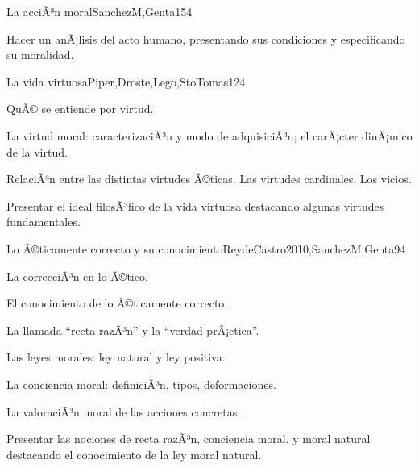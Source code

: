 \begin{syllabus}
\begin{unit}{La acciÃ³n moral}{SanchezM,Genta}{15}{4}
\begin{topics}
\end{topics}
\begin{unitgoals}
	\item Hacer un anÃ¡lisis del acto humano, presentando sus condiciones y especificando su moralidad.
\end{unitgoals}
\end{unit}

\begin{unit}{La vida virtuosa}{Piper,Droste,Lego,StoTomas}{12}{4}
\begin{topics}
	\item	QuÃ© se entiende por virtud.
	\item	La virtud moral: caracterizaciÃ³n y modo de adquisiciÃ³n; el carÃ¡cter dinÃ¡mico de la virtud.
	\item	RelaciÃ³n entre las distintas virtudes Ã©ticas. Las virtudes cardinales. Los vicios.

\end{topics}
\begin{unitgoals}
	\item Presentar el ideal filosÃ³fico de la vida virtuosa destacando algunas virtudes fundamentales.
\end{unitgoals}
\end{unit}

\begin{unit}{Lo Ã©ticamente correcto y su conocimiento}{ReydeCastro2010,SanchezM,Genta}{9}{4}
\begin{topics}
	\item 	La correcciÃ³n en lo Ã©tico.
	\item 	El conocimiento de lo Ã©ticamente correcto.
	\item 	La llamada ``recta razÃ³n'' y la ``verdad prÃ¡ctica''. 
	\item 	Las leyes morales: ley natural y ley positiva.
	\item 	La conciencia moral: definiciÃ³n, tipos, deformaciones. 
	\item 	La valoraciÃ³n moral de las acciones concretas.

\end{topics}

\begin{unitgoals}
	\item Presentar las nociones de recta razÃ³n, conciencia moral, y moral natural destacando el conocimiento de la ley moral natural.
\end{unitgoals}
\end{unit}



\begin{coursebibliography}
\end{coursebibliography}

\end{syllabus}
